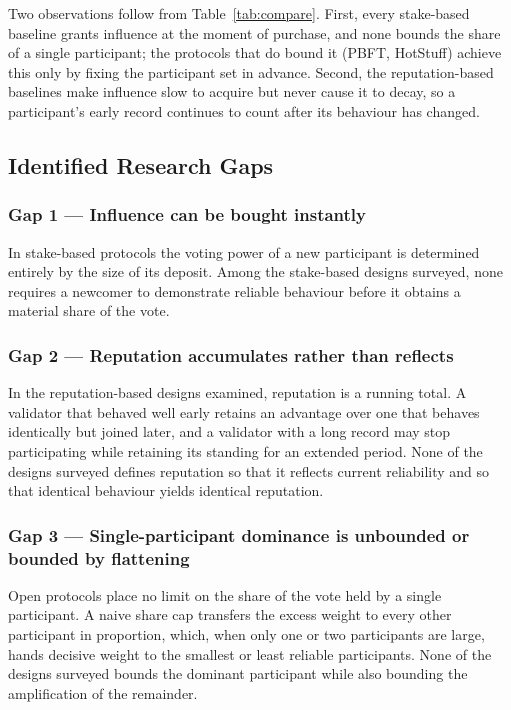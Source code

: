 \documentclass[conference]{IEEEtran}
\begin{document}
Two observations follow from Table~\ref{tab:compare}. First, every stake-based baseline grants influence at the moment of purchase, and none bounds the share of a single participant; the protocols that do bound it (PBFT, HotStuff) achieve this only by fixing the participant set in advance. Second, the reputation-based baselines make influence slow to acquire but never cause it to decay, so a participant's early record continues to count after its behaviour has changed.

\subsection{Identified Research Gaps}
\subsubsection{Gap 1 --- Influence can be bought instantly}
In stake-based protocols the voting power of a new participant is determined entirely by the size of its deposit. Among the stake-based designs surveyed, none requires a newcomer to demonstrate reliable behaviour before it obtains a material share of the vote.

\subsubsection{Gap 2 --- Reputation accumulates rather than reflects}
In the reputation-based designs examined, reputation is a running total. A validator that behaved well early retains an advantage over one that behaves identically but joined later, and a validator with a long record may stop participating while retaining its standing for an extended period. None of the designs surveyed defines reputation so that it reflects current reliability and so that identical behaviour yields identical reputation.

\subsubsection{Gap 3 --- Single-participant dominance is unbounded or bounded by flattening}
Open protocols place no limit on the share of the vote held by a single participant. A naive share cap transfers the excess weight to every other participant in proportion, which, when only one or two participants are large, hands decisive weight to the smallest or least reliable participants. None of the designs surveyed bounds the dominant participant while also bounding the amplification of the remainder.
\end{document}
